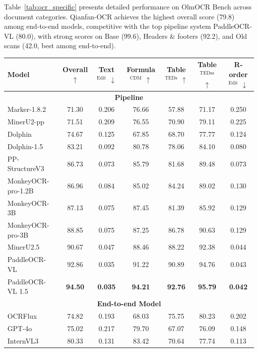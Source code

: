 \documentclass[dvipsnames]{article}
\begin{document}
\FloatBarrier

Table~\ref{tab:ocr_specific} presents detailed performance on OlmOCR Bench across document categories. Qianfan-OCR achieves the highest overall score (79.8) among end-to-end models, competitive with the top pipeline system PaddleOCR-VL (80.0), with strong scores on Base (99.6), Headers \& footers (92.2), and Old scans (42.0, best among end-to-end).

\begin{table}[htbp]
\centering
\small
\setlength{\tabcolsep}{5pt}
\begin{tabular}{l|c|c|c|c|c|c}
\toprule
\textbf{Model} & \textbf{Overall} $\uparrow$ & \textbf{Text$^{\text{Edit}}$} $\downarrow$ & \textbf{Formula$^{\text{CDM}}$} $\uparrow$ & \textbf{Table$^{\text{TEDs}}$} $\uparrow$ & \textbf{Table$^{\text{TEDss}}$} $\uparrow$ & \textbf{R-order$^{\text{Edit}}$} $\downarrow$ \\
\midrule
\multicolumn{7}{c}{\textbf{Pipeline}} \\
\midrule
Marker-1.8.2 & 71.30 & 0.206 & 76.66 & 57.88 & 71.17 & 0.250 \\
MinerU2-pp & 71.51 & 0.209 & 76.55 & 70.90 & 79.11 & 0.225 \\
Dolphin & 74.67 & 0.125 & 67.85 & 68.70 & 77.77 & 0.124 \\
Dolphin-1.5 & 83.21 & 0.092 & 80.78 & 78.06 & 84.10 & 0.080 \\
PP-StructureV3 & 86.73 & 0.073 & 85.79 & 81.68 & 89.48 & 0.073 \\
MonkeyOCR-pro-1.2B & 86.96 & 0.084 & 85.02 & 84.24 & 89.02 & 0.130 \\
MonkeyOCR-3B & 87.13 & 0.075 & 87.45 & 81.39 & 85.92 & 0.129 \\
MonkeyOCR-pro-3B & 88.85 & 0.075 & 87.25 & 86.78 & 90.63 & 0.129 \\
MinerU2.5 & 90.67 & 0.047 & 88.46 & 88.22 & 92.38 & 0.044 \\
PaddleOCR-VL & 92.86 & 0.035 & 91.22 & 90.89 & 94.76 & 0.043 \\
PaddleOCR-VL 1.5 & \textbf{94.50} & \textbf{0.035} & \textbf{94.21} & \textbf{92.76} & \textbf{95.79} & \textbf{0.042} \\
\midrule
\multicolumn{7}{c}{\textbf{End-to-end Model}} \\
\midrule
OCRFlux & 74.82 & 0.193 & 68.03 & 75.75 & 80.23 & 0.202 \\
GPT-4o & 75.02 & 0.217 & 79.70 & 67.07 & 76.09 & 0.148 \\
InternVL3 & 80.33 & 0.131 & 83.42 & 70.64 & 77.74 & 0.113 \\

\end{tabular}
\end{table}
\end{document}

